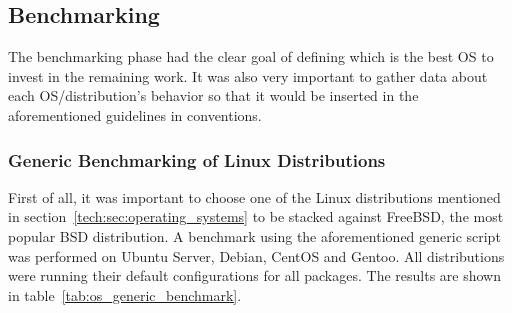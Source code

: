\subsection{Benchmarking}
The benchmarking phase had the clear goal of defining which is the best OS to invest in the remaining work. It was also very important to gather data about each OS/distribution's behavior so that it would be inserted in the aforementioned guidelines in conventions.

\subsubsection{Generic Benchmarking of Linux Distributions}
First of all, it was important to choose one of the Linux distributions mentioned in section~\ref{tech:sec:operating_systems} to be stacked against FreeBSD, the most popular BSD distribution. A benchmark using the aforementioned generic script was performed on Ubuntu Server, Debian, CentOS and Gentoo. All distributions were running their default configurations for all packages. The results are shown in table~\ref{tab:os_generic_benchmark}.
